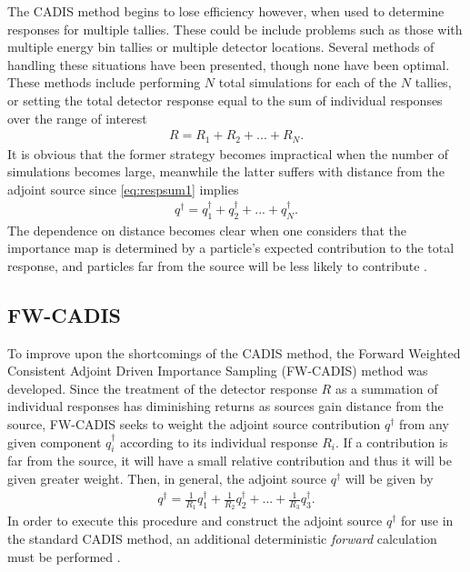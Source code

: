\documentclass[10pt]{article}
\begin{document}
The CADIS method begins to lose efficiency however, when used to determine responses for multiple tallies. These could be include problems such as those with multiple energy bin tallies or multiple detector locations. Several methods of handling these situations have been presented, though none have been optimal. These methods include performing $N$ total simulations for each of the $N$ tallies, or setting the total detector response equal to the sum of individual responses over the range of interest \cite{software:advantg}
\begin{align}
R = R_1 + R_2 + ... + R_N.
\label{eq:respsum1}
\end{align}
It is obvious that the former strategy becomes impractical when the number of simulations becomes large, meanwhile the latter suffers with distance from the adjoint source since \cref{eq:respsum1} implies
\begin{align}
q^{\dagger} = q^{\dagger}_1 + q^{\dagger}_2 + ... + q^{\dagger}_N.
\label{eq:respsum2}
\end{align}
The dependence on distance becomes clear when one considers that the importance map is determined by a particle's expected contribution to the total response, and particles far from the source will be less likely to contribute \cite{software:advantg}.



\subsection{FW-CADIS}
\label{sec:math:fw-cadis}

To improve upon the shortcomings of the CADIS method, the Forward Weighted Consistent Adjoint Driven Importance Sampling (FW-CADIS) method was developed. Since the treatment of the detector response $R$ as a summation of individual responses has diminishing returns as sources gain distance from the source, FW-CADIS seeks to weight the adjoint source contribution $q^\dagger$ from any given component $q^\dagger_i$ according to its individual response $R_i$. If a contribution is far from the source, it will have a small relative contribution and thus it will be given greater weight. Then, in general, the adjoint source $q^\dagger$ will be given by
\begin{align}
q^\dagger = \frac{1}{R_1}q^\dagger_1 +  \frac{1}{R_2}q^\dagger_2 + ... +  \frac{1}{R_3}q^\dagger_3.
\label{eq:respsum}
\end{align}
In order to execute this procedure and construct the adjoint source $q^\dagger$ for use in the standard CADIS method, an additional deterministic \textit{forward} calculation must be performed \cite{software:advantg}.
\end{document}
